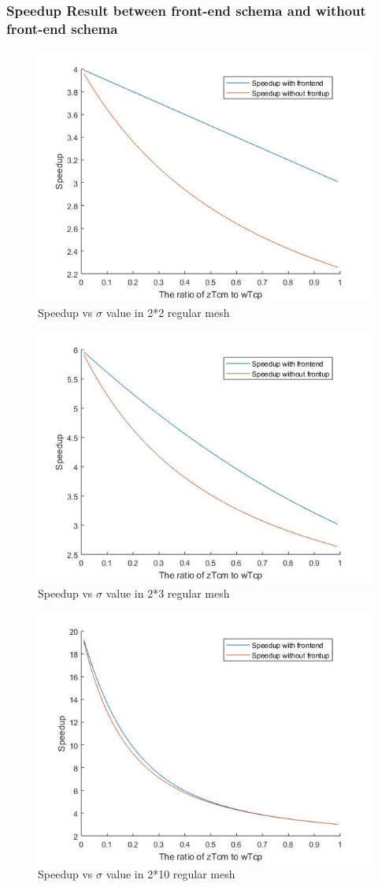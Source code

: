 \subsubsection{Speedup Result between front-end schema and without front-end schema}
\begin{figure}[h]
\centering\includegraphics[width=0.7\linewidth]{figure/c22}
\caption{Speedup vs $\sigma$ value in 2*2 regular mesh}
\label{22}
\end{figure}

\begin{figure}[h]
\centering\includegraphics[width=0.7\linewidth]{figure/c23}
\caption{Speedup vs $\sigma$ value in 2*3 regular mesh}
\label{23}
\end{figure}

\begin{figure}[h]
\centering\includegraphics[width=0.7\linewidth]{figure/c210}
\caption{Speedup vs $\sigma$ value in 2*10 regular mesh}
\label{210}
\end{figure}

